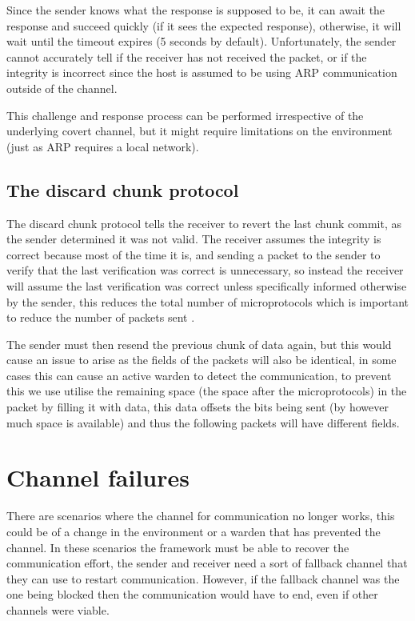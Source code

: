 Since the sender knows what the response is supposed to be, it can await the response and succeed quickly (if it sees the expected response), otherwise, it will wait until the timeout expires (5 seconds by default). Unfortunately, the sender cannot accurately tell if the receiver has not received the packet, or if the integrity is incorrect since the host is assumed to be using ARP communication outside of the channel.

This challenge and response process can be performed irrespective of the underlying covert channel, but it might require limitations on the environment (just as ARP requires a local network). 

\subsection{The discard chunk protocol}

The discard chunk protocol tells the receiver to revert the last chunk commit, as the sender determined it was not valid. The receiver assumes the integrity is correct because most of the time it is, and sending a packet to the sender to verify that the last verification was correct is unnecessary, so instead the receiver will assume the last verification was correct unless specifically informed otherwise by the sender, this reduces the total number of microprotocols which is important to reduce the number of packets sent \cite{DRiCCBoCP}.

The sender must then resend the previous chunk of data again, but this would cause an issue to arise as the fields of the packets will also be identical, in some cases this can cause an active warden to detect the communication, to prevent this we use utilise the remaining space (the space after the microprotocols) in the packet by filling it with data, this data offsets the bits being sent (by however much space is available) and thus the following packets will have different fields.

\section{Channel failures}

There are scenarios where the channel for communication no longer works, this could be of a change in the environment or a warden that has prevented the channel. In these scenarios the framework must be able to recover the communication effort, the sender and receiver need a sort of fallback channel that they can use to restart communication. However, if the fallback channel was the one being blocked then the communication would have to end, even if other channels were viable.


